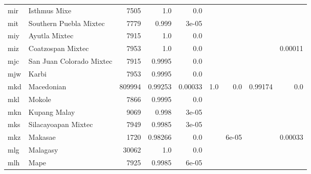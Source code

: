 \documentclass[11pt]{article}
\begin{document}
\begin{table*}[h]
{\begin{tabular}{llrrrrrrr}
mir         & Isthmus Mixe         & 7505         & 1.0         & 0.0         &          &          &          &          \\

mit         & Southern Puebla Mixtec         & 7779         & 0.999         & 3e-05         &          &          &          &          \\

miy         & Ayutla Mixtec         & 7915         & 1.0         & 0.0         &          &          &          &          \\

miz         & Coatzospan Mixtec         & 7953         & 1.0         & 0.0         &          &          &          & 0.00011         \\

mjc         & San Juan Colorado Mixtec         & 7915         & 0.9995         & 0.0         &          &          &          &          \\

mjw         & Karbi         & 7953         & 0.9995         & 0.0         &          &          &          &          \\

mkd         & Macedonian         & 809994         & 0.99253         & 0.00033         & 1.0         & 0.0         & 0.99174         & 0.0         \\

mkl         & Mokole         & 7866         & 0.9995         & 0.0         &          &          &          &          \\

mkn         & Kupang Malay         & 9069         & 0.998         & 3e-05         &          &          &          &          \\

mks         & Silacayoapan Mixtec         & 7949         & 0.9985         & 3e-05         &          &          &          &          \\

mkz         & Makasae         & 1720         & 0.98266         & 0.0         &          & 6e-05         &          & 0.00033         \\

mlg         & Malagasy         & 30062         & 1.0         & 0.0         &          &          &          &          \\

mlh         & Mape         & 7925         & 0.9985         & 6e-05         &          &          &          &          \\


\end{tabular}}
\end{table*}
\end{document}

